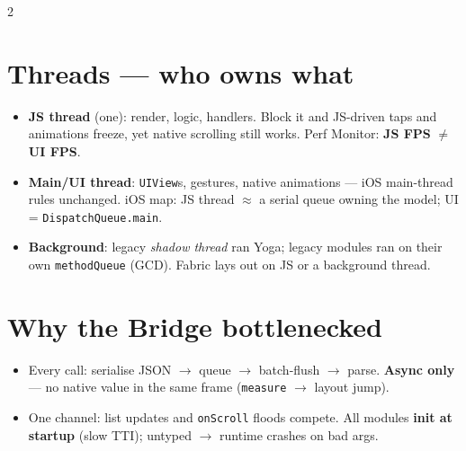 \documentclass[8pt]{extarticle}
\begin{document}
\begin{multicols}{2}
\raggedright

\section{Threads — who owns what}
\begin{itemize}
  \item \textbf{JS thread} (one): render, logic, handlers. Block it and JS-driven taps and
        animations freeze, yet native scrolling still works. Perf Monitor: \textbf{JS FPS} $\neq$ \textbf{UI FPS}.
  \item \textbf{Main/UI thread}: \texttt{UIView}s, gestures, native animations — iOS
        main-thread rules unchanged. iOS map: JS thread $\approx$ a serial queue owning
        the model; UI = \texttt{DispatchQueue.main}.
  \item \textbf{Background}: legacy \emph{shadow thread} ran Yoga; legacy modules ran on
        their own \texttt{methodQueue} (GCD). Fabric lays out on JS or a background thread.
\end{itemize}

\section{Why the Bridge bottlenecked}
\begin{itemize}
  \item Every call: serialise JSON $\to$ queue $\to$ batch-flush $\to$ parse. \textbf{Async
        only} — no native value in the same frame (\texttt{measure} $\to$ layout jump).
  \item One channel: list updates and \texttt{onScroll} floods compete. All modules
        \textbf{init at startup} (slow TTI); untyped $\to$ runtime crashes on bad args.
\end{itemize}


\end{multicols}
\end{document}
